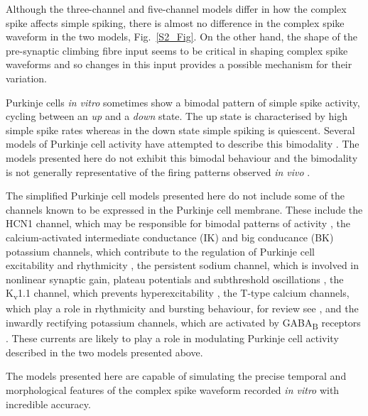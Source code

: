 \documentclass[utf8]{frontiersSCNS} %
\begin{document}
Although the three-channel and five-channel models differ in how the
complex spike affects simple spiking, there is almost no difference in
the complex spike waveform in the two models, Fig.~\ref{S2_Fig}. On
the other hand, the shape of the pre-synaptic climbing fibre input
seems to be critical in shaping complex spike waveforms and so changes
in this input provides a possible mechanism for their variation.

Purkinje cells \textsl{in vitro} sometimes show a bimodal pattern of
simple spike activity, cycling between an \textsl{up} and a
\textsl{down} state. The up state is characterised by high simple
spike rates whereas in the down state simple spiking is
quiescent. Several models of Purkinje cell activity have attempted to
describe this bimodality
\cite{Forrest2014,ForrestEtAl2012,LlinasSugimori1980b,LoewensteinEtAl2005,McKayEtAl2007,WilliamsEtAl2002}. The
models presented here do not exhibit this bimodal behaviour and the
bimodality is not generally representative of the firing patterns
observed \textsl{in vivo}
\cite{CerminaraRawson2004,McKayEtAl2007,SchonewilleEtAl2006}.

The simplified Purkinje cell models presented here do not include some
of the channels known to be expressed in the Purkinje cell
membrane. These include the HCN1 channel, which may be responsible for
bimodal patterns of activity \cite{LoewensteinEtAl2005}, the
calcium-activated intermediate conductance (IK) and big conducance
(BK) potassium channels, which contribute to the regulation of
Purkinje cell excitability and rhythmicity \cite{CheronEtAl2009}, the
persistent sodium channel, which is involved in nonlinear synaptic
gain, plateau potentials and subthreshold oscillations
\cite{KayEtAl1998}, the K\textsubscript{v}1.1 channel, which prevents
hyperexcitability \cite{ZhangEtAl1999}, the T-type calcium channels,
which play a role in rhythmicity and bursting behaviour, for review
see \cite{CainSnutch2010}, and the inwardly rectifying potassium
channels, which are activated by GABA\textsubscript{B} receptors
\cite{TabataEtAl2005}. These currents are likely to play a role in
modulating Purkinje cell activity described in the two models
presented above.

The models presented here are capable of simulating the precise temporal and morphological features of the complex spike waveform recorded \textit{in vitro} with incredible accuracy.

\end{document}
